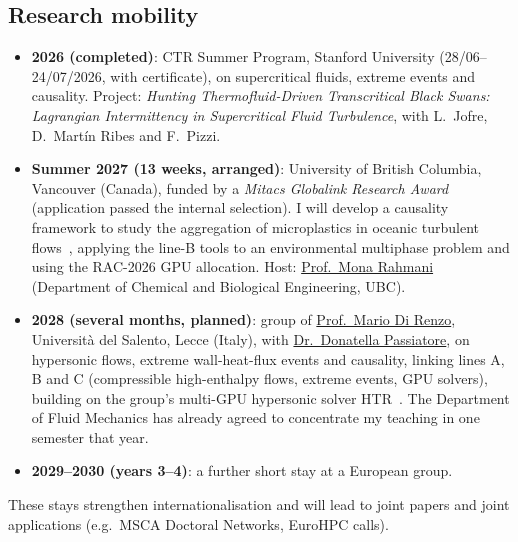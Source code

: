 \documentclass[11pt]{article}
\begin{document}
\subsection{Research mobility}\label{sec:mobility}
\begin{itemize}
\item \textbf{2026 (completed)}: CTR Summer Program, Stanford University (28/06--24/07/2026, with
certificate), on supercritical fluids, extreme events and causality. Project:
\emph{Hunting Thermofluid-Driven Transcritical Black Swans: Lagrangian Intermittency in Supercritical Fluid Turbulence}, with L.\ Jofre, D.\ Mart\'in Ribes and F.\ Pizzi.
\item \textbf{Summer 2027 (13 weeks, arranged)}: University of British Columbia,
Vancouver (Canada), funded by a \emph{Mitacs Globalink Research Award} (application
passed the internal selection). I will develop a causality framework to study the
aggregation of microplastics in oceanic turbulent flows~\cite{vanSebille2020}, applying
the line-B tools to an environmental multiphase problem and using the RAC-2026 GPU allocation. Host: \href{https://chbe.ubc.ca/mona-rahmani/}{Prof.\ Mona Rahmani} (Department of Chemical and Biological
Engineering, UBC).
\item \textbf{2028 (several months, planned)}: group of \href{https://www.unisalento.it/scheda-utente/-/people/mario.direnzo}{Prof.\ Mario Di Renzo}, Universit\`a del Salento, Lecce (Italy), with
\href{https://www.unisalento.it/scheda-utente/-/people/donatella.passiatore}{Dr.\ Donatella Passiatore}, on hypersonic flows, extreme
wall-heat-flux events and causality, linking lines A, B and C (compressible
high-enthalpy flows, extreme events, GPU solvers), building on the group's
multi-GPU hypersonic solver HTR~\cite{DiRenzo2020}. The Department of Fluid Mechanics has
already agreed to concentrate my teaching in one semester that year.
\item \textbf{2029--2030 (years 3--4)}: a further short stay at a European group.
\end{itemize}
These stays strengthen internationalisation and will lead to joint papers and joint
applications (e.g.\ MSCA Doctoral Networks, EuroHPC calls).
\end{document}
